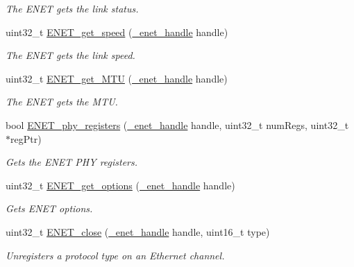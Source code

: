 \begin{DoxyCompactItemize}
\begin{DoxyCompactList}\small\item\em The E\+N\+ET gets the link status. \end{DoxyCompactList}\item 
uint32\+\_\+t \hyperlink{group__enet__rtcs__adaptor_ga7251759468e069b5e8dae119a8f19956}{E\+N\+E\+T\+\_\+get\+\_\+speed} (\hyperlink{group__enet__rtcs__adaptor_gac8e61675abb18254042bf944bf122def}{\+\_\+enet\+\_\+handle} handle)
\begin{DoxyCompactList}\small\item\em The E\+N\+ET gets the link speed. \end{DoxyCompactList}\item 
uint32\+\_\+t \hyperlink{group__enet__rtcs__adaptor_gaf8ccea54f1eb8c89937b50d0214e4fbd}{E\+N\+E\+T\+\_\+get\+\_\+\+M\+TU} (\hyperlink{group__enet__rtcs__adaptor_gac8e61675abb18254042bf944bf122def}{\+\_\+enet\+\_\+handle} handle)
\begin{DoxyCompactList}\small\item\em The E\+N\+ET gets the M\+TU. \end{DoxyCompactList}\item 
bool \hyperlink{group__enet__rtcs__adaptor_ga314bba9e7915d31716d7b33177d15f61}{E\+N\+E\+T\+\_\+phy\+\_\+registers} (\hyperlink{group__enet__rtcs__adaptor_gac8e61675abb18254042bf944bf122def}{\+\_\+enet\+\_\+handle} handle, uint32\+\_\+t num\+Regs, uint32\+\_\+t $\ast$reg\+Ptr)
\begin{DoxyCompactList}\small\item\em Gets the E\+N\+ET P\+HY registers. \end{DoxyCompactList}\item 
uint32\+\_\+t \hyperlink{group__enet__rtcs__adaptor_ga34b0d0755c07443fe46b5f7dd28e9a29}{E\+N\+E\+T\+\_\+get\+\_\+options} (\hyperlink{group__enet__rtcs__adaptor_gac8e61675abb18254042bf944bf122def}{\+\_\+enet\+\_\+handle} handle)
\begin{DoxyCompactList}\small\item\em Gets E\+N\+ET options. \end{DoxyCompactList}\item 
uint32\+\_\+t \hyperlink{group__enet__rtcs__adaptor_gad425ffe0a6280760e9b70b0ae18faa01}{E\+N\+E\+T\+\_\+close} (\hyperlink{group__enet__rtcs__adaptor_gac8e61675abb18254042bf944bf122def}{\+\_\+enet\+\_\+handle} handle, uint16\+\_\+t type)
\begin{DoxyCompactList}\small\item\em Unregisters a protocol type on an Ethernet channel. \end{DoxyCompactList}\item 

\end{DoxyCompactItemize}
